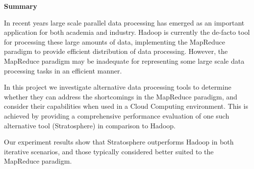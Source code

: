 \begin{center}
    {\LARGE\bf Summary}
\end{center}

In recent years large scale parallel data processing has emerged as an important application for both academia and industry. Hadoop is currently the de-facto tool for processing these large amounts of data, implementing the MapReduce paradigm to provide efficient distribution of data processing. However, the MapReduce paradigm may be inadequate for representing some large scale data processing tasks in an efficient manner.

In this project we investigate alternative data processing tools to determine whether they can address the shortcomings in the MapReduce paradigm, and consider their capabilities when used in a Cloud Computing environment. This is achieved by providing a comprehensive performance evaluation of one such alternative tool (Stratosphere) in comparison to Hadoop.

Our experiment results show that Stratosphere outperforms Hadoop in both iterative scenarios, and those typically considered better suited to the MapReduce paradigm. 